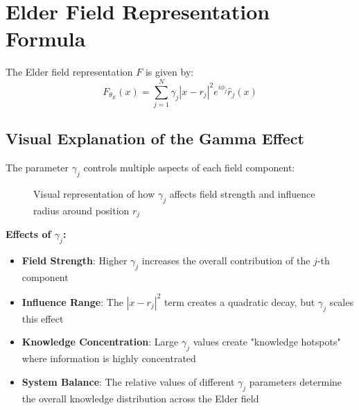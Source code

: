 \section{Elder Field Representation Formula}

The Elder field representation $F$ is given by:
\begin{equation}
F_{\theta_E}(x) = \sum_{j=1}^{N} \gamma_j |x - r_j|^2 e^{i\phi_j} \hat{r}_j(x)
\end{equation}

\subsection{Visual Explanation of the Gamma Effect}

The parameter $\gamma_j$ controls multiple aspects of each field component:

\begin{figure}[h]
\centering
{}
\caption{Visual representation of how $\gamma_j$ affects field strength and influence radius around position $r_j$}
\end{figure}

\textbf{Effects of $\gamma_j$:}
\begin{itemize}
    \item \textbf{Field Strength}: Higher $\gamma_j$ increases the overall contribution of the $j$-th component
    \item \textbf{Influence Range}: The $|x - r_j|^2$ term creates a quadratic decay, but $\gamma_j$ scales this effect
    \item \textbf{Knowledge Concentration}: Large $\gamma_j$ values create "knowledge hotspots" where information is highly concentrated
    \item \textbf{System Balance}: The relative values of different $\gamma_j$ parameters determine the overall knowledge distribution across the Elder field
\end{itemize}

